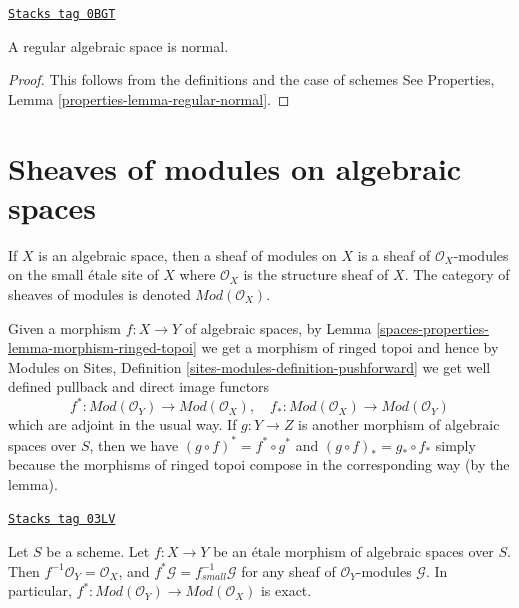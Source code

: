 \begin{lemma}
\label{spaces-properties-lemma-regular-normal}
\href{https://stacks.math.columbia.edu/tag/0BGT}{\texttt{Stacks tag 0BGT}}

A regular algebraic space is normal.
\end{lemma}

\begin{proof}
This follows from the definitions and the case of schemes
See Properties, Lemma \ref{properties-lemma-regular-normal}.
\end{proof}

\section{Sheaves of modules on algebraic spaces}
\label{spaces-properties-section-modules}
If $X$ is an algebraic space, then a sheaf of modules on $X$ is
a sheaf of $\mathcal{O}_X$-modules on the small \'etale site of $X$
where $\mathcal{O}_X$ is the structure sheaf of $X$. The category
of sheaves of modules is denoted $\textit{Mod}(\mathcal{O}_X)$.

\medskip\noindent
Given a morphism $f : X \to Y$ of algebraic spaces, by
Lemma \ref{spaces-properties-lemma-morphism-ringed-topoi}
we get a morphism of ringed topoi and hence by
Modules on Sites, Definition \ref{sites-modules-definition-pushforward}
we get well defined pullback and direct image functors
\begin{equation}
\label{equation-push-pull}
f^* :
\textit{Mod}(\mathcal{O}_Y)
\longrightarrow
\textit{Mod}(\mathcal{O}_X), \quad
f_* :
\textit{Mod}(\mathcal{O}_X)
\longrightarrow
\textit{Mod}(\mathcal{O}_Y)
\end{equation}
which are adjoint in the usual way. If $g : Y \to Z$ is another morphism
of algebraic spaces over $S$, then we have
$(g \circ f)^* = f^* \circ g^*$ and $(g \circ f)_* = g_* \circ f_*$
simply because the morphisms of ringed topoi compose in the corresponding
way (by the lemma).

\begin{lemma}
\label{spaces-properties-lemma-etale-exact-pullback}
\href{https://stacks.math.columbia.edu/tag/03LV}{\texttt{Stacks tag 03LV}}

Let $S$ be a scheme.
Let $f : X \to Y$ be an \'etale morphism of algebraic spaces over $S$.
Then $f^{-1}\mathcal{O}_Y = \mathcal{O}_X$, and
$f^*\mathcal{G} = f_{small}^{-1}\mathcal{G}$ for any sheaf of
$\mathcal{O}_Y$-modules $\mathcal{G}$. In particular,
$f^* : \textit{Mod}(\mathcal{O}_Y) \to \textit{Mod}(\mathcal{O}_X)$
is exact.
\end{lemma}

